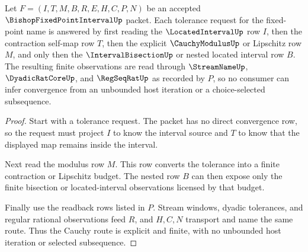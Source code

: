\begin{theorem}
\label{thm:bishop-fixed-point-interval-cauchy-modulus-route}
Let $F=(I,T,M,B,R,E,H,C,P,N)$ be an accepted $\BishopFixedPointIntervalUp$ packet. Each tolerance request for the fixed-point name is answered by first reading the $\LocatedIntervalUp$ row $I$, then the contraction self-map row $T$, then the explicit $\CauchyModulusUp$ or Lipschitz row $M$, and only then the $\IntervalBisectionUp$ or nested located interval row $B$. The resulting finite observations are read through $\StreamNameUp$, $\DyadicRatCoreUp$, and $\RegSeqRatUp$ as recorded by $P$, so no consumer can infer convergence from an unbounded host iteration or a choice-selected subsequence.
\end{theorem}
\begin{proof}
Start with a tolerance request. The packet has no direct convergence row, so the request must project $I$ to know the interval source and $T$ to know that the displayed map remains inside the interval.

Next read the modulus row $M$. This row converts the tolerance into a finite contraction or Lipschitz budget. The nested row $B$ can then expose only the finite bisection or located-interval observations licensed by that budget.

Finally use the readback rows listed in $P$. Stream windows, dyadic tolerances, and regular rational observations feed $R$, and $H,C,N$ transport and name the same route. Thus the Cauchy route is explicit and finite, with no unbounded host iteration or selected subsequence.
\end{proof}

